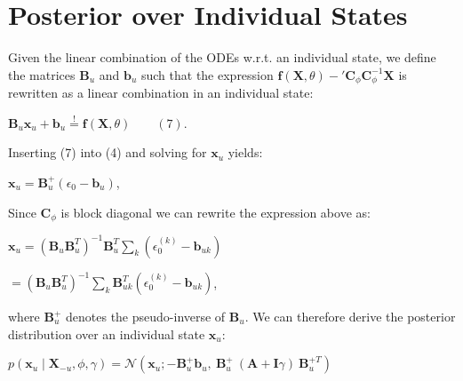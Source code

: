 \section{Posterior over Individual States}

\begin{par}
Given the linear combination of the ODEs w.r.t. an individual state, we define the matrices $\mathbf{B}_u$ and $\mathbf{b}_u$ such that the expression $\mathbf{f}(\mathbf{X},\theta) - {'\mathbf{C}}_{\phi} \mathbf{C}_{\phi}^{-1} \mathbf{X}$ is rewritten as a linear combination in an individual state:
\end{par} \vspace{1em}
\begin{par}
$\mathbf{B}_{u} \mathbf{x}_u + \mathbf{b}_{u} \stackrel{!}{=} \mathbf{f}(\mathbf{X},\theta) \qquad (7)$.
\end{par} \vspace{1em}
\begin{par}
Inserting (7) into (4) and solving for $\mathbf{x}_u$ yields:
\end{par} \vspace{1em}
\begin{par}
$\mathbf{x}_u = \mathbf{B}_{u}^+ \left( \epsilon_0 -\mathbf{b}_{u} \right)$,
\end{par} \vspace{1em}
\begin{par}
Since $\mathbf{C}_{\phi}$ is block diagonal we can rewrite the expression above as:
\end{par} \vspace{1em}
\begin{par}
$\mathbf{x}_u = \left( \mathbf{B}_{u} \mathbf{B}_{u}^T \right)^{-1} \mathbf{B}_{u}^T \sum_k \left(\epsilon_0^{(k)} -\mathbf{b}_{uk} \right)$
\end{par} \vspace{1em}
\begin{par}
$= \left( \mathbf{B}_{u} \mathbf{B}_{u}^T \right)^{-1} \sum_k \mathbf{B}_{uk}^T \left(\epsilon_0^{(k)} -\mathbf{b}_{uk} \right)$,
\end{par} \vspace{1em}
\begin{par}
where $\mathbf{B}_{u}^+$ denotes the pseudo-inverse of $\mathbf{B}_{u}$. We can therefore derive the posterior distribution over an individual state $\mathbf{x}_u$:
\end{par} \vspace{1em}
\begin{par}
$p(\mathbf{x}_u \mid \mathbf{X}_{-u}, \phi, \gamma) = \mathcal{N}\left(\mathbf{x}_u ; -\mathbf{B}_{u}^+ \mathbf{b}_u, ~\mathbf{B}_u^{+} ~ (\mathbf{A} + \mathbf{I}\gamma) ~ \mathbf{B}_u^{+T} \right)$
\end{par} \vspace{1em}
